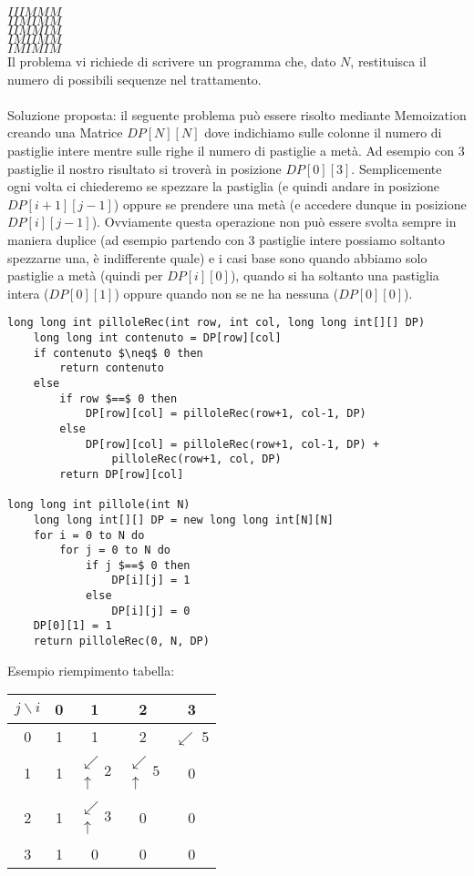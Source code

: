 \documentclass[../cheatSheetAlgoritmi.tex]{subfiles}
\begin{document}
$IIIMMM$\\
$IIMIMM$\\
$IIMMIM$\\
$IMIIMM$\\
$IMIMIM$\\
Il problema vi richiede di scrivere un programma che, dato $N$, restituisca il numero di possibili sequenze nel trattamento.\\\\
Soluzione proposta: il seguente problema può essere risolto mediante Memoization creando una Matrice $DP[N][N]$ dove indichiamo sulle colonne il numero di pastiglie intere mentre sulle righe il numero di pastiglie a metà. Ad esempio con 3 pastiglie il nostro risultato si troverà in posizione $DP[0][3]$. Semplicemente ogni volta ci chiederemo se spezzare la pastiglia (e quindi andare in posizione $DP[i+1][j-1]$) oppure se prendere una metà (e accedere dunque in posizione $DP[i][j-1]$). Ovviamente questa operazione non può essere svolta sempre in maniera duplice (ad esempio partendo con 3 pastiglie intere possiamo soltanto spezzarne una, è indifferente quale) e i casi base sono quando abbiamo solo pastiglie a metà (quindi per $DP[i][0]$), quando si ha soltanto una pastiglia intera ($DP[0][1]$) oppure quando non se ne ha nessuna ($DP[0][0]$).
\begin{lstlisting}[caption=Le pillole della Zia]
long long int pilloleRec(int row, int col, long long int[][] DP)
	long long int contenuto = DP[row][col]
	if contenuto $\neq$ 0 then
		return contenuto
	else
		if row $==$ 0 then
			DP[row][col] = pilloleRec(row+1, col-1, DP)
		else
			DP[row][col] = pilloleRec(row+1, col-1, DP) + 
				pilloleRec(row+1, col, DP)
		return DP[row][col]

long long int pillole(int N)
	long long int[][] DP = new long long int[N][N]
	for i = 0 to N do
		for j = 0 to N do
			if j $==$ 0 then
				DP[i][j] = 1
			else
				DP[i][j] = 0
	DP[0][1] = 1
	return pilloleRec(0, N, DP)
\end{lstlisting}
\newpage
Esempio riempimento tabella:\\
\begin{center}
	\renewcommand{\arraystretch}{1.2}
	\begin{tabular}{ |c|c|c|c|c| } 
		\hline
			$j \backslash i$ &0 &1 &2 &3\\
		\hline
			0 &1 &1 &2 &$\swarrow$ 5\\
		\hline
			1 &1 & $\substack{\swarrow\\[-1em] \uparrow} 2$ & $\substack{\swarrow\\[-1em] \uparrow} 5$&0 \\
		\hline
			2 &1 & $\substack{\swarrow\\[-1em] \uparrow} 3$ &0 &0\\
		\hline
			3 &1 &0 &0 &0\\
		\hline
	\end{tabular}
\end{center}
\newpage
\end{document}
